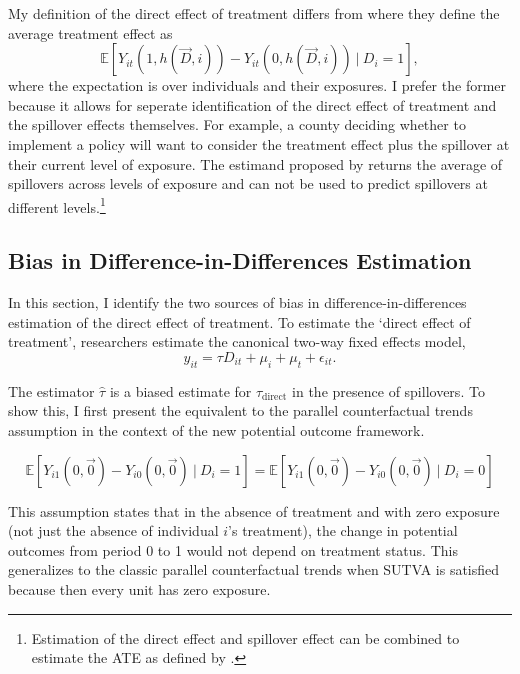 \documentclass[11pt]{article}
\begin{document}
My definition of the direct effect of treatment differs from \citet{Sävje_Aronow_Hudgens_2019} where they define the average treatment effect as \[ 
    \mathbb{E} \left[ Y_{it}(1, h(\vec{D}, i)) - Y_{it}(0, h(\vec{D}, i)) \ \vert \ D_i = 1 \right],
\] 
where the expectation is over individuals and their exposures. I prefer the former because it allows for seperate identification of the direct effect of treatment and the spillover effects themselves. For example, a county deciding whether to implement a policy will want to consider the treatment effect plus the spillover at their current level of exposure. The estimand proposed by \citet{Sävje_Aronow_Hudgens_2019} returns the average of spillovers across levels of exposure and can not be used to predict spillovers at different levels.\footnote{Estimation of the direct effect and spillover effect can be combined to estimate the ATE as defined by \citet{Sävje_Aronow_Hudgens_2019}.}


\subsection{Bias in Difference-in-Differences Estimation}

In this section, I identify the two sources of bias in difference-in-differences estimation of the direct effect of treatment. To estimate the `direct effect of treatment', researchers estimate the canonical two-way fixed effects model, 
\begin{equation}\label{eq:twfe}    
    y_{it} = \tau D_{it} + \mu_i + \mu_t + \epsilon_{it}.
\end{equation}

The estimator $\hat{\tau}$ is a biased estimate for $\tau_{\text{direct}}$ in the presence of spillovers. To show this, I first present the equivalent to the parallel counterfactual trends assumption in the context of the new potential outcome framework. 

\begin{assumption}\label{eq:parallel}
    \[ 
        \mathbb{E}\left[ Y_{i1}(0, \vec{0}) - Y_{i0}(0, \vec{0}) \ \vert \ D_i = 1 \right] = 
        \mathbb{E}\left[ Y_{i1}(0, \vec{0}) - Y_{i0}(0, \vec{0}) \ \vert \ D_i = 0 \right]
    \]
\end{assumption}
This assumption states that in the absence of treatment and with zero exposure (not just the absence of individual $i$'s treatment), the change in potential outcomes from period 0 to 1 would not depend on treatment status. This generalizes to the classic parallel counterfactual trends when SUTVA is satisfied because then every unit has zero exposure.
\end{document}
